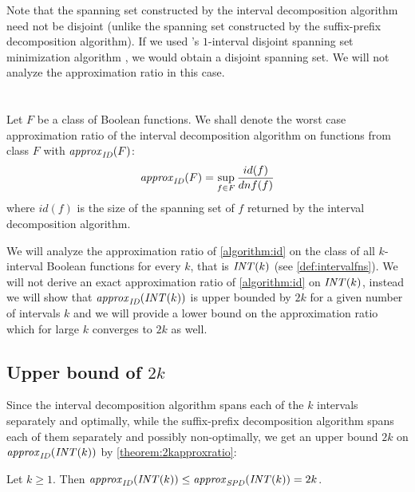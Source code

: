 Note that the spanning set constructed
by the interval decomposition algorithm
need not be disjoint
(unlike the spanning set constructed
by the suffix-prefix decomposition algorithm).
If we used \citeauthor{Schieber2005154}'s
$1$-interval disjoint spanning set minimization algorithm
\citep{Schieber2005154},
we would obtain a disjoint spanning set.
We will not analyze the approximation ratio in this case.

\section{\titleapproxratio}

Let $F$ be a class of Boolean functions.
We shall denote the worst case approximation ratio
of the interval decomposition algorithm
on functions from class $F$ with $\mathit{approx}_{\mathit{ID}} (F)$:
$$
\mathit{approx}_{\mathit{ID}} (F)
= \sup_{f \in F}{\frac{id(f)}{dnf(f)}}
$$
where $id(f)$ is the size of the spanning set of $f$
returned by the interval decomposition algorithm.

We will analyze the approximation ratio
of \cref{algorithm:id}
on the class of all $k$-interval Boolean functions for every $k$,
that is $\mathit{INT} (k)$
(see \cref{def:intervalfns}).
We will not derive an exact approximation ratio of \cref{algorithm:id} on $\mathit{INT} (k)$,
instead we will show that $\mathit{approx}_{\mathit{ID}} (\mathit{INT} (k))$ is upper bounded by $2k$ for a given number of intervals $k$ and we will provide a lower bound on the approximation ratio which for large $k$ converges to $2k$ as well.

\subsection{Upper bound of \texorpdfstring{$2k$}{2k}}

Since the interval decomposition algorithm
spans each of the $k$ intervals separately and optimally,
while the suffix-prefix decomposition algorithm
spans each of them separately and possibly non-optimally,
we get an upper bound $2k$
on $\mathit{approx}_{\mathit{ID}} (\mathit{INT} (k))$ by \cref{theorem:2kapproxratio}:

\begin{observation}
\label{observation:approxidintkupper}
Let $k \geq 1$.
Then $\mathit{approx}_{\mathit{ID}} (\mathit{INT} (k)) \leq \mathit{approx}_{\mathit{SPD}} (\mathit{INT} (k)) = 2k$.
\end{observation}

